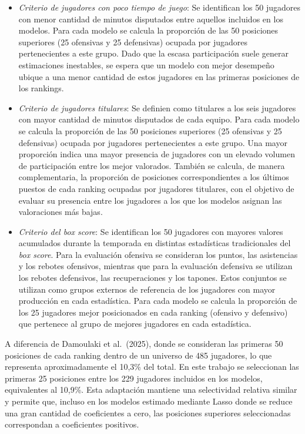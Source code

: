 \documentclass[
  12pt,
]{article}
\begin{document}
\begin{itemize}
\item
  \emph{Criterio de jugadores con poco tiempo de juego}: Se identifican
  los 50 jugadores con menor cantidad de minutos disputados entre
  aquellos incluidos en los modelos. Para cada modelo se calcula la
  proporción de las 50 posiciones superiores (25 ofensivas y 25
  defensivas) ocupada por jugadores pertenecientes a este grupo. Dado
  que la escasa participación suele generar estimaciones inestables, se
  espera que un modelo con mejor desempeño ubique a una menor cantidad
  de estos jugadores en las primeras posiciones de los rankings.
\item
  \emph{Criterio de jugadores titulares}: Se definien como titulares a
  los seis jugadores con mayor cantidad de minutos disputados de cada
  equipo. Para cada modelo se calcula la proporción de las 50 posiciones
  superiores (25 ofensivas y 25 defensivas) ocupada por jugadores
  pertenecientes a este grupo. Una mayor proporción indica una mayor
  presencia de jugadores con un elevado volumen de participación entre
  los mejor valorados. También se calcula, de manera complementaria, la
  proporción de posiciones correspondientes a los últimos puestos de
  cada ranking ocupadas por jugadores titulares, con el objetivo de
  evaluar su presencia entre los jugadores a los que los modelos asignan
  las valoraciones más bajas.
\item
  \emph{Criterio del box score}: Se identifican los 50 jugadores con
  mayores valores acumulados durante la temporada en distintas
  estadísticas tradicionales del \emph{box score}. Para la evaluación
  ofensiva se consideran los puntos, las asistencias y los rebotes
  ofensivos, mientras que para la evaluación defensiva se utilizan los
  rebotes defensivos, las recuperaciones y los tapones. Estos conjuntos
  se utilizan como grupos externos de referencia de los jugadores con
  mayor producción en cada estadística. Para cada modelo se calcula la
  proporción de los 25 jugadores mejor posicionados en cada ranking
  (ofensivo y defensivo) que pertenece al grupo de mejores jugadores en
  cada estadística.
\end{itemize}

A diferencia de Damoulaki et al.~(2025), donde se consideran las
primeras 50 posiciones de cada ranking dentro de un universo de 485
jugadores, lo que representa aproximadamente el 10,3\% del total. En
este trabajo se seleccionan las primeras 25 posiciones entre los 229
jugadores incluidos en los modelos, equivalentes al 10,9\%. Esta
adaptación mantiene una selectividad relativa similar y permite que,
incluso en los modelos estimado mediante Lasso donde se reduce una gran
cantidad de coeficientes a cero, las posiciones superiores seleccionadas
correspondan a coeficientes positivos.
\end{document}
